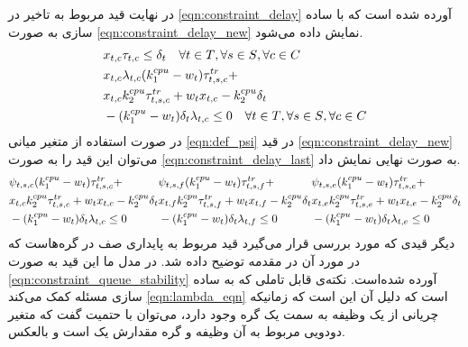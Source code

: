 	در نهایت قید مربوط به تاخیر در \cref{eqn:constraint_delay} آورده شده است که با ساده سازی به صورت \cref{eqn:constraint_delay_new} نمایش داده می‌شود. 
	\begin{subequations}
		\begin{align}
			&x_{t,c}\tau_{t,c}\le \delta_t \quad \forall{t \in T}, \forall{s \in S}, \forall{c \in C} \label{eqn:constraint_delay} \\			
			&\notag x_{t,c}\lambda_{t,c}(k_1^{cpu}-w_t)\tau^{tr}_{t,s,c} + \\ 
			&\notag x_{t,c}k_2^{cpu}\tau_{t,s,c}^{tr}+w_t x_{t,c}-k_2^{cpu}\delta_t \\ &-(k_1^{cpu}-w_t)\delta_t\lambda_{t,c} \le 0 \quad \forall{t \in T}, \forall{s \in S}, \forall{c \in C} \label{eqn:constraint_delay_new}
		\end{align}
	\end{subequations}
	در صورت استفاده از متغیر میانی \cref{eqn:def_psi} در قید \cref{eqn:constraint_delay_new} می‌توان این قید را به صورت \cref{eqn:constraint_delay_last} به صورت نهایی نمایش داد. 
	\begin{subequations}\label{eqn:constraint_delay_last}
		\begin{align}
		&\notag\psi_{t,s,c}(k_1^{cpu}-w_t)\tau^{tr}_{t,s,c} + \\ &\notag x_{t,c}k_2^{cpu}\tau_{t,s,c}^{tr}+w_t x_{t,c}-k_2^{cpu}\delta_t \\ &-(k_1^{cpu}-w_t)\delta_t\lambda_{t,c} \le 0
		\end{align}
		\begin{align}
		&\notag\psi_{t,s,f}(k_1^{cpu}-w_t)\tau^{tr}_{t,s,f} + \\ &\notag x_{t,f}k_2^{cpu}\tau_{t,s,f}^{tr}+w_t x_{t,f}-k_2^{cpu}\delta_t \\ &-(k_1^{cpu}-w_t)\delta_t\lambda_{t,f} \le 0
		\end{align}
		\begin{align}
		&\notag\psi_{t,s,e}(k_1^{cpu}-w_t)\tau^{tr}_{t,s,e} + \\ &\notag x_{t,e}k_2^{cpu}\tau_{t,s,e}^{tr}+w_t x_{t,e}-k_2^{cpu}\delta_t \\ &-(k_1^{cpu}-w_t)\delta_t\lambda_{t,e} \le 0
		\end{align}
	\end{subequations}
	دیگر قیدی که مورد بررسی قرار می‌گیرد قید مربوط به پایداری صف در گره‌هاست که در مورد آن در مقدمه توضیح داده شد. در مدل ما این قید به صورت \cref{eqn:constraint_queue_stability} آورده شده‌است. نکته‌ی قابل تاملی که به ساده سازی مسئله کمک می‌کند \cref{eqn:lambda_eqn} است که دلیل آن این است که زمانیکه چریانی از یک وظیفه به سمت یک گره وجود دارد، می‌توان با حتمیت گفت که متغیر دودویی مربوط به آن وظیفه و گره مقدارش یک است و بالعکس. 
